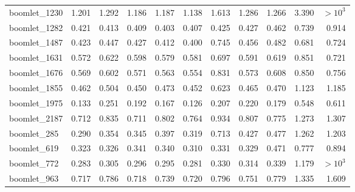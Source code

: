 {\begin{longtable}{@{}p{2.2cm}@{\hspace{6pt}}rrrrrrrrrr@{}}
\ttfamily\scriptsize boomlet\_1230 & 1.201 & 1.292 & \cellcolor{medalSilver}1.186 & \cellcolor{medalBronze}1.187 & \cellcolor{medalGold}1.138 & 1.613 & 1.286 & 1.266 & 3.390 & $>\!10^{3}$ \\
\ttfamily\scriptsize boomlet\_1282 & 0.421 & 0.413 & \cellcolor{medalBronze}0.409 & \cellcolor{medalGold}0.403 & \cellcolor{medalSilver}0.407 & 0.425 & 0.427 & 0.462 & 0.739 & 0.914 \\
\ttfamily\scriptsize boomlet\_1487 & \cellcolor{medalBronze}0.423 & 0.447 & 0.427 & \cellcolor{medalSilver}0.412 & \cellcolor{medalGold}0.400 & 0.745 & 0.456 & 0.482 & 0.681 & 0.724 \\
\ttfamily\scriptsize boomlet\_1631 & \cellcolor{medalGold}0.572 & 0.622 & 0.598 & \cellcolor{medalSilver}0.579 & \cellcolor{medalBronze}0.581 & 0.697 & 0.591 & 0.619 & 0.851 & 0.721 \\
\ttfamily\scriptsize boomlet\_1676 & \cellcolor{medalBronze}0.569 & 0.602 & 0.571 & \cellcolor{medalSilver}0.563 & \cellcolor{medalGold}0.554 & 0.831 & 0.573 & 0.608 & 0.850 & 0.756 \\
\ttfamily\scriptsize boomlet\_1855 & \cellcolor{medalBronze}0.462 & 0.504 & \cellcolor{medalGold}0.450 & 0.473 & \cellcolor{medalSilver}0.452 & 0.623 & 0.465 & 0.470 & 1.123 & 1.185 \\
\ttfamily\scriptsize boomlet\_1975 & \cellcolor{medalSilver}0.133 & 0.251 & 0.192 & \cellcolor{medalBronze}0.167 & \cellcolor{medalGold}0.126 & 0.207 & 0.220 & 0.179 & 0.548 & 0.611 \\
\ttfamily\scriptsize boomlet\_2187 & \cellcolor{medalSilver}0.712 & 0.835 & \cellcolor{medalGold}0.711 & 0.802 & \cellcolor{medalBronze}0.764 & 0.934 & 0.807 & 0.775 & 1.273 & 1.307 \\
\ttfamily\scriptsize boomlet\_285 & \cellcolor{medalGold}0.290 & 0.354 & \cellcolor{medalBronze}0.345 & 0.397 & \cellcolor{medalSilver}0.319 & 0.713 & 0.427 & 0.477 & 1.262 & 1.203 \\
\ttfamily\scriptsize boomlet\_619 & \cellcolor{medalSilver}0.323 & \cellcolor{medalBronze}0.326 & 0.341 & 0.340 & \cellcolor{medalGold}0.310 & 0.331 & 0.329 & 0.471 & 0.777 & 0.894 \\
\ttfamily\scriptsize boomlet\_772 & \cellcolor{medalSilver}0.283 & 0.305 & 0.296 & \cellcolor{medalBronze}0.295 & \cellcolor{medalGold}0.281 & 0.330 & 0.314 & 0.339 & 1.179 & $>\!10^{3}$ \\
\ttfamily\scriptsize boomlet\_963 & \cellcolor{medalGold}0.717 & 0.786 & \cellcolor{medalSilver}0.718 & 0.739 & \cellcolor{medalBronze}0.720 & 0.796 & 0.751 & 0.779 & 1.335 & 1.609 \\

\end{longtable}}
